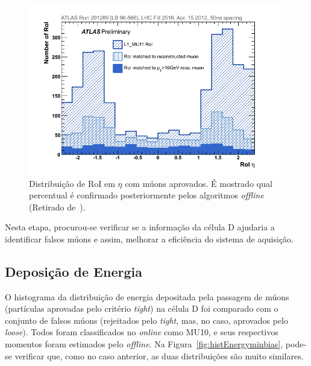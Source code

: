 \begin{figure}[htp!]
   \centering
   \includegraphics[width=11cm]{images/muon_rejected.png}
   \caption[Distribuição de RoI em $\eta$ com múons aprovados. É mostrado qual
   percentual é confirmado posteriormente pelos algoritmos \emph{offline} ]%
   {Distribuição de RoI em $\eta$ com múons aprovados. É mostrado qual
   percentual é confirmado posteriormente pelos algoritmos \emph{offline}
   (Retirado de~\cite{BUTTINGER2012}).}
   \label{fig:rejected}
\end{figure}

Nesta etapa, procurou-se verificar se a informação da  célula D ajudaria a
identificar falsos múons e assim, melhorar a eficiência do sistema de aquisição.


\subsection*{Deposição de Energia}


O histograma da distribuição de energia depositada pela passagem de múons
(partículas aprovadas pelo critério \emph{tight}) na célula D foi comparado com
o conjunto de falsos múons (rejeitados pelo \emph{tight}, mas, no caso,
aprovados pelo \emph{loose}).  Todos foram classificados no \emph{online} como
MU10, e seus respectivos momentos foram estimados pelo \emph{offline}. Na
Figura~\ref{fig:histEnergyminbias}, pode-se verificar que, como no caso
anterior,  as duas distribuições são muito similares.


